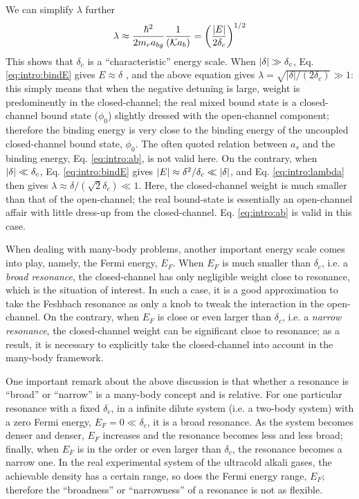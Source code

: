 We can simplify $\lambda$ further
\begin{equation}\label{eq:intro:lambda}
\lambda\approx\frac{\hbar^{2}}{2m_{r}a_{bg}}\frac{1}{(\mathcal{K}a_{b})}=\left(\frac{\left\lvert{E}\right\rvert}{2\delta_{c}}\right)^{1/2}
\end{equation}
This shows that  $\delta_{c}$ is a ``characteristic'' energy scale. When $\left\lvert{\delta}\right\rvert\gg\delta_{c}$, Eq. \ref{eq:intro:bindE} gives $E\approx\delta$ , and the above equation gives $\lambda=\sqrt{|\delta|/(2\delta_{c})}\gg1$: this simply means that when the negative detuning is large, weight is predominently in the closed-channel; the real mixed bound state is a closed-channel bound state ($\phi_{0}$) slightly dressed with the open-channel component; therefore the binding energy is very close to the binding energy  of the uncoupled closed-channel bound state, $\phi_{0}$.  The often quoted relation between $a_{s}$ and the binding energy, Eq. \ref{eq:intro:ab},  is not valid here.  On the contrary, when $\left\lvert{\delta}\right\rvert\ll\delta_{c}$, Eq. \ref{eq:intro:bindE}  gives $\left\lvert{E}\right\rvert\approx\delta^{2}/\delta_{c}\ll\left\lvert{\delta}\right\rvert$,  and Eq. \ref{eq:intro:lambda} then gives $\lambda\approx{\delta/(\sqrt{2}\delta_{c})}\ll1$.  Here, the closed-channel weight is much smaller than that of the open-channel; the real bound-state is essentially an open-channel affair with little dress-up from the closed-channel.  Eq. \ref{eq:intro:ab} is valid in this case. %

When dealing with  many-body problems, another important energy scale comes into play, namely, the Fermi energy, $E_{F}$.  When $E_{F}$ is much smaller than $\delta_{c}$, i.e. a \emph{broad resonance},  the closed-channel has only negligible weight close to resonance, which is the situation of interest. In such a case, it is a good approximation to take the Feshbach resonance as only a knob to tweak the interaction in the open-channel.  On the contrary, when $E_{F}$ is close or even larger than $\delta_{c}$, i.e. a \emph{narrow resonance}, the closed-channel weight can be  significant clsoe to  resonance; as a result, it is necessary to explicitly take the closed-channel into account in the many-body framework.  

One important remark about the above discussion is that whether a resonance is ``broad'' or ``narrow'' is a many-body concept and is relative.  For one particular resonance with a fixed $\delta_{c}$, in a infinite dilute system (i.e. a two-body system) with a zero Fermi energy,  $E_{F}=0\ll\delta_{c}$, it is a broad resonance.  As the system becomes denser and denser, $E_{F}$ increases and the resonance becomes less and less broad; finally, when $E_{F}$ is in the order or even larger than $\delta_{c}$, the resonance becomes a narrow one.  In the real experimental system of the ultracold alkali gases, the achievable density has a certain range, so does the Fermi energy range, $E_{F}$; therefore the ``broadness'' or ``narrowness'' of a resonance is not as flexible. 











